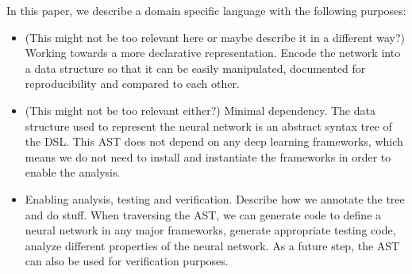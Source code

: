 In this paper, we describe a domain specific language with the following purposes:
\begin{itemize}
\item (This might not be too relevant here or maybe describe it in a different way?) Working towards a more declarative representation. Encode the network into a data structure so that it can be easily manipulated, documented for reproducibility and compared to each other.
\item (This might not be too relevant either?) Minimal dependency. The data structure used to represent the neural network is an abstract syntax tree of the DSL. This AST does not depend on any deep learning frameworks, which means we do not need to install and instantiate the frameworks in order to enable the analysis.
\item Enabling analysis, testing and verification. Describe how we annotate the tree and do stuff. When traversing the AST, we can generate code to define a neural network in any major frameworks, generate appropriate testing code, analyze different properties of the neural network. As a future step, the AST can also be used for verification purposes.
\end{itemize}






